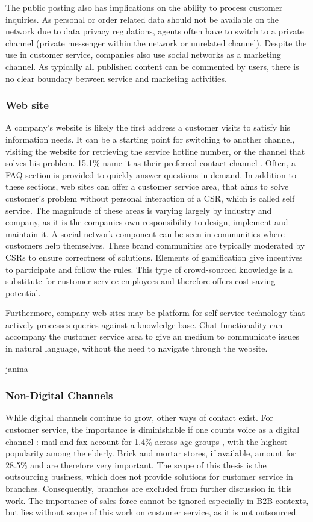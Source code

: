 		The public posting also has implications on the ability to process customer inquiries. As personal or order related data should not be available on the network due to data privacy regulations, agents often have to switch to a private channel (\ie private messenger within the network or unrelated channel). Despite the use in customer service, companies also use social networks as a marketing channel. As typically all published content can be commented by users, there is no clear boundary between service and marketing activities. 
		
		
		\subsubsection{Web site}
		
		A company's website is likely the first address a customer visits to satisfy his information needs. It can be a starting point for switching to another channel, \ie visiting the website for retrieving the service hotline number, or the channel that solves his problem. 15.1\% name it as their preferred contact channel \citep{Agnischock2015}. Often, a \acrfull{FAQ} section is provided to quickly answer questions in-demand. In addition to these sections, web sites can offer a customer service area, that aims to solve customer's problem without personal interaction of a \acrshort{CSR}, which is called self service. The magnitude of these areas is varying largely by industry and company, as it is the companies own responsibility to design, implement and maintain it. A social network component can be seen in communities where customers help themselves. These brand communities \citep{Hsieh_2017} are typically moderated by \acrshort{CSR}s to ensure correctness of solutions. Elements of gamification give incentives to participate and follow the rules. This type of crowd-sourced knowledge is a substitute for customer service employees and therefore offers cost saving potential. 
		
		Furthermore, company web sites may be platform for self service technology that actively processes queries against a knowledge base. Chat functionality can accompany the customer service area to give an medium to communicate issues in natural language, without the need to navigate through the website. 
	
		
		janina
		\subsubsection{Non-Digital Channels}
		While digital channels continue to grow, other ways of contact exist. For customer service, the importance is diminishable if one counts voice as a digital channel : mail and fax account for 1.4\% across age groups \citep{Agnischock2015}, with the highest popularity among the elderly. Brick and mortar stores, if available, amount for 28.5\% and are therefore very important. The scope of this thesis is the outsourcing business, which does not provide solutions for customer service in branches. Consequently, branches are excluded from further discussion in this work. The importance of sales force cannot be ignored especially in B2B contexts, but lies without scope of this work on customer service, as it is not outsourced. 
		
